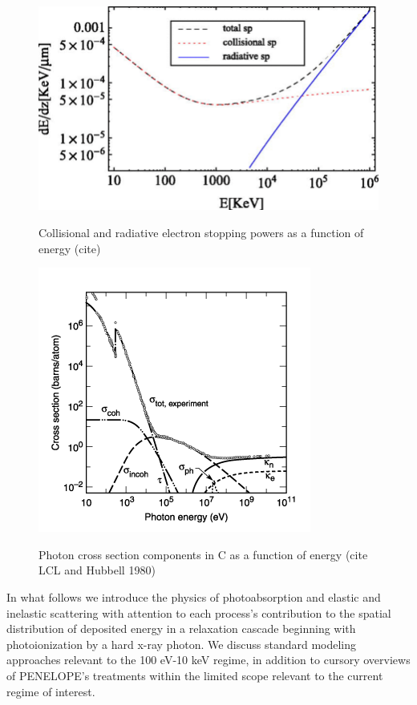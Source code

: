 \documentclass [11pt, proquest, article] {uwthesis}[2016/11/22]
\begin{document}
\begin{figure}[h] \label{fig:col_rad}
\caption{Collisional and radiative electron stopping powers as a function of energy (cite)}
\centering
\includegraphics[scale=0.4]{../Figures/collisional_sp.png}
\label{fig:sp}
\end{figure}

\begin{figure}[h] 
\caption{Photon cross section components in C as a function of energy (cite LCL and Hubbell 1980)}
\centering
\includegraphics[scale=1]{../Figures/photon_sigma.png}
\label{photon_sigma}
\end{figure}

In what follows we introduce the physics of photoabsorption and elastic and inelastic scattering with attention to each process's contribution to the spatial distribution of deposited energy in a relaxation cascade beginning with photoionization by a hard x-ray photon. We discuss standard modeling approaches relevant to the 100 eV-10 keV regime, in addition to cursory overviews of PENELOPE's treatments within the limited scope relevant to the current regime of interest. %
\end{document}
